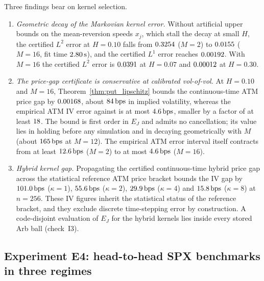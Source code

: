 Three findings bear on kernel selection.
\begin{enumerate}[1.]
  \item \emph{Geometric decay of the Markovian kernel error.} Without artificial upper bounds on the mean-reversion speeds $x_j$, which stall the decay at small $H$, the certified $L^2$ error at $H=0.10$ falls from $0.3254$ ($M=2$) to $0.0155$ ($M=16$, fit time $2.80\,\mathrm{s}$), and the certified $L^1$ error reaches $0.00192$. With $M=16$ the certified $L^2$ error is $0.0391$ at $H=0.07$ and $0.00012$ at $H=0.30$.
  \item \emph{The price-gap certificate is conservative at calibrated vol-of-vol.} At $H=0.10$ and $M=16$, Theorem~\ref{thm:put_lipschitz} bounds the continuous-time ATM price gap by $0.00168$, about $84\,\mathrm{bps}$ in implied volatility, whereas the empirical ATM IV error against \RCBridge{} is at most $4.6\,\mathrm{bps}$, smaller by a factor of at least $18$. The bound is first order in $E_J$ and admits no cancellation; its value lies in holding before any simulation and in decaying geometrically with $M$ (about $165\,\mathrm{bps}$ at $M=12$). The empirical ATM error interval itself contracts from at least $12.6\,\mathrm{bps}$ ($M=2$) to at most $4.6\,\mathrm{bps}$ ($M=16$).
  \item \emph{Hybrid kernel gap.} Propagating the certified continuous-time hybrid price gap across the statistical reference ATM price bracket bounds the IV gap by $101.0\,\mathrm{bps}$ ($\kappa=1$), $55.6\,\mathrm{bps}$ ($\kappa=2$), $29.9\,\mathrm{bps}$ ($\kappa=4$) and $15.8\,\mathrm{bps}$ ($\kappa=8$) at $n=256$. These IV figures inherit the statistical status of the reference bracket, and they exclude discrete time-stepping error by construction. A code-disjoint evaluation of $E_J$ for the hybrid kernels lies inside every stored Arb ball (check~I3).
\end{enumerate}

\subsection{Experiment E4: head-to-head SPX benchmarks in three regimes}
\label{sec:e4}

